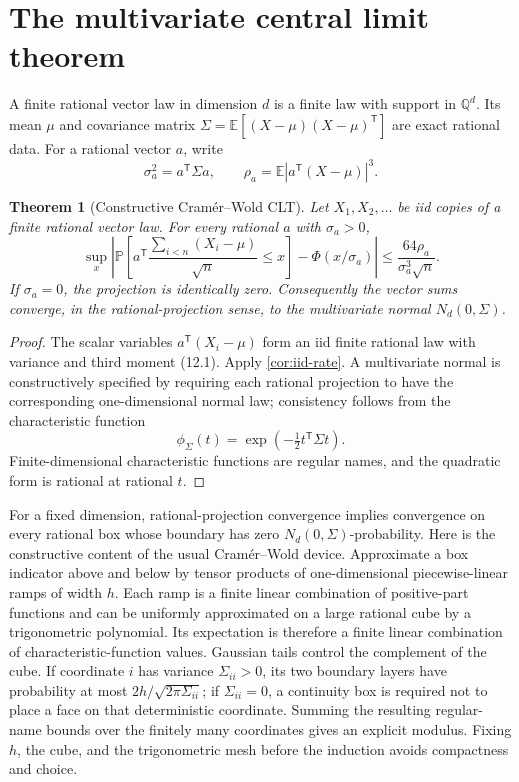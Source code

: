 \documentclass[11pt]{article}
\newtheorem{theorem}{Theorem}[section]
\newcommand{\Q}{\mathbb Q}
\newcommand{\E}{\mathbb E}
\newcommand{\Pp}{\mathbb P}
\newcommand{\PhiN}{\Phi}
\begin{document}
\section{The multivariate central limit theorem}
\label{sec:multivariate}

A finite rational vector law in dimension \(d\) is a finite law with support
in \(\Q^d\).  Its mean \(\mu\) and covariance matrix
\(\Sigma=\E[(X-\mu)(X-\mu)^{\mathsf T}]\) are exact rational data.  For a
rational vector \(a\), write
\[
 \sigma_a^2=a^{\mathsf T}\Sigma a,
 \qquad \rho_a=\E|a^{\mathsf T}(X-\mu)|^3.           \tag{12.1}
\]

\begin{theorem}[Constructive Cram\'er--Wold CLT]\label{thm:cramer-wold}
Let \(X_1,X_2,\ldots\) be iid copies of a finite rational vector law.  For
every rational \(a\) with \(\sigma_a>0\),
\[
 \sup_x\left|
 \Pp\!\left[
  a^{\mathsf T}\frac{\sum_{i<n}(X_i-\mu)}{\sqrt n}
  \le x\right]
 -\PhiN(x/\sigma_a)
 \right|
 \le\frac{64\rho_a}{\sigma_a^3\sqrt n}.             \tag{12.2}
\]
If \(\sigma_a=0\), the projection is identically zero.  Consequently the
vector sums converge, in the rational-projection sense, to the multivariate
normal \(N_d(0,\Sigma)\).
\end{theorem}

\begin{proof}
The scalar variables \(a^{\mathsf T}(X_i-\mu)\) form an iid finite rational
law with variance and third moment (12.1).  Apply
\cref{cor:iid-rate}.  A multivariate normal is constructively specified by
requiring each rational projection to have the corresponding one-dimensional
normal law; consistency follows from the characteristic function
\[
 \phi_\Sigma(t)=\exp(-\tfrac12t^{\mathsf T}\Sigma t). \tag{12.3}
\]
Finite-dimensional characteristic functions are regular names, and the
quadratic form is rational at rational \(t\).
\end{proof}

For a fixed dimension, rational-projection convergence implies convergence
on every rational box whose boundary has zero \(N_d(0,\Sigma)\)-probability.
Here is the constructive content of the usual Cram\'er--Wold device.
Approximate a box indicator above and below by tensor products of
one-dimensional piecewise-linear ramps of width \(h\).  Each ramp is a finite
linear combination of positive-part functions and can be uniformly
approximated on a large rational cube by a trigonometric polynomial.  Its
expectation is therefore a finite linear combination of
characteristic-function values.  Gaussian tails control the complement of
the cube.  If coordinate \(i\) has variance \(\Sigma_{ii}>0\), its two
boundary layers have probability at most
\(2h/\sqrt{2\pi\Sigma_{ii}}\); if \(\Sigma_{ii}=0\), a continuity box is
required not to place a face on that deterministic coordinate.  Summing the
resulting regular-name bounds over the finitely many coordinates gives an
explicit modulus.  Fixing \(h\), the cube, and the trigonometric mesh before
the induction avoids compactness and choice.
\end{document}
